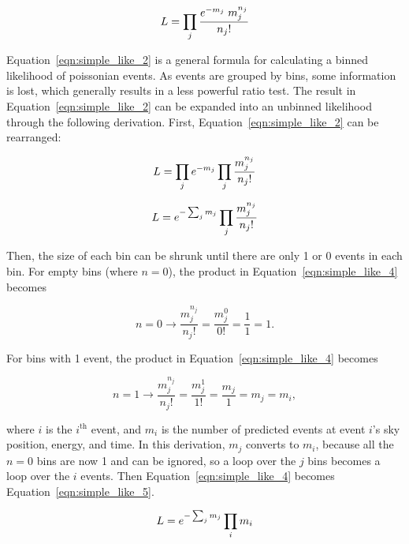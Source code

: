   \begin{equation}\label{eqn:simple_like_2}
    L = \prod_j \frac{ e^{-m_j} \; m_{j}^{n_j}}{n_{j}!}
  \end{equation}

  Equation~\ref{eqn:simple_like_2} is a general formula for calculating a binned likelihood of poissonian events.
  As events are grouped by bins, some information is lost, which generally results in a less powerful ratio test.
  The result in Equation~\ref{eqn:simple_like_2} can be expanded into an unbinned likelihood through the following derivation.
  First, Equation~\ref{eqn:simple_like_2} can be rearranged:
  
  \begin{equation}\label{eqn:simple_like_3}
    L = \prod_j e^{-m_j} \prod_j \frac{m_j^{n_j}}{n_{j}!}
  \end{equation}
    
  \begin{equation}\label{eqn:simple_like_4}
    L = e^{- \sum_j m_j} \prod_j \frac{m_j^{n_j}}{n_{j}!}
  \end{equation}
  
  Then, the size of each bin can be shrunk until there are only 1 or 0 events in each bin.
  For empty bins (where $n=0$), the product in Equation~\ref{eqn:simple_like_4} becomes
  
  \begin{equation}\label{eqn:simple_like_4a}
    n=0 \rightarrow \frac{m_j^{n_j}}{n_j!} = \frac{m_j^{0}}{0!} = \frac{1}{1} = 1 .
  \end{equation}

  For bins with 1 event, the product in Equation~\ref{eqn:simple_like_4} becomes

  \begin{equation}\label{eqn:simple_like_4b}
    n=1 \rightarrow \frac{m_j^{n_j}}{n_j!} = \frac{m_j^1}{1!} = \frac{m_j}{1} = m_j = m_i ,
  \end{equation}

  where $i$ is the $i^{\textrm{th}}$ event, and $m_i$ is the number of predicted events at event $i$'s sky position, energy, and time.
  In this derivation, $m_j$ converts to $m_i$, because all the $n=0$ bins are now 1 and can be ignored, so a loop over the $j$ bins becomes a loop over the $i$ events.
  Then Equation~\ref{eqn:simple_like_4} becomes Equation~\ref{eqn:simple_like_5}.
  
  \begin{equation}\label{eqn:simple_like_5}
    L = e^{- \sum_j m_j} \prod_i m_i
  \end{equation}
  
